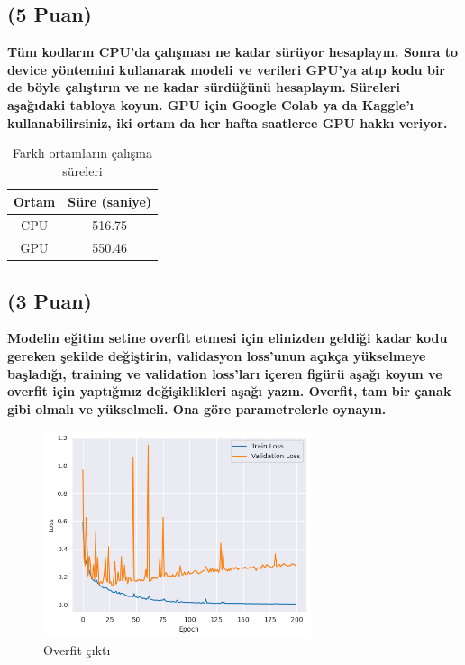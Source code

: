 \documentclass[11pt]{article}
\begin{document}
\subsection{(5 Puan)} \textbf{Tüm kodların CPU'da çalışması ne kadar sürüyor hesaplayın. Sonra to device yöntemini kullanarak modeli ve verileri GPU'ya atıp kodu bir de böyle çalıştırın ve ne kadar sürdüğünü hesaplayın. Süreleri aşağıdaki tabloya koyun. GPU için Google Colab ya da Kaggle'ı kullanabilirsiniz, iki ortam da her hafta saatlerce GPU hakkı veriyor.}

\begin{table}[ht!]
    \centering
    \caption{Farklı ortamların çalışma süreleri}
    \begin{tabular}{c|c}
        Ortam & Süre (saniye) \\\hline
        CPU & 516.75  \\
        GPU & 550.46\\
    \end{tabular}
    \label{tab:my_table}
\end{table}

\subsection{(3 Puan)} 
\textbf{Modelin eğitim setine overfit etmesi için elinizden geldiği kadar kodu gereken şekilde değiştirin, validasyon loss'unun açıkça yükselmeye başladığı, training ve validation loss'ları içeren figürü aşağı koyun ve overfit için yaptığınız değişiklikleri aşağı yazın. Overfit, tam bir çanak gibi olmalı ve yükselmeli. Ona göre parametrelerle oynayın.}
\begin{figure}[ht!]
    \centering
    \includegraphics[width=0.7\textwidth]{figure/overfitfigure.png}
    \caption{Overfit çıktı}
    \label{fig:mlpfigure}
\end{figure}
\end{document}
